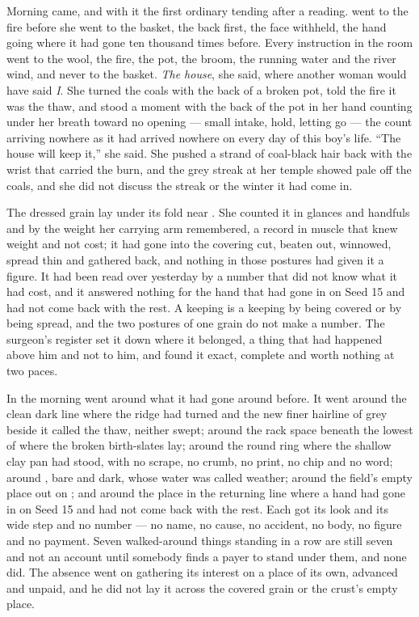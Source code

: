 Morning came, and with it the first ordinary tending after a reading.  went to the fire before she went to the basket, the back first, the face withheld, the hand going where it had gone ten thousand times before. Every instruction in the room went to the wool, the fire, the pot, the broom, the running water and the river wind, and never to the basket. \emph{The house}, she said, where another woman would have said \emph{I}. She turned the coals with the back of a broken pot, told the fire it was the thaw, and stood a moment with the back of the pot in her hand counting under her breath toward no opening --- small intake, hold, letting go --- the count arriving nowhere as it had arrived nowhere on every day of this boy's life. “The house will keep it,” she said. She pushed a strand of coal-black hair back with the wrist that carried the burn, and the grey streak at her temple showed pale off the coals, and she did not discuss the streak or the winter it had come in.

The dressed grain lay under its fold near . She counted it in glances and handfuls and by the weight her carrying arm remembered, a record in muscle that knew weight and not cost; it had gone into the covering cut, beaten out, winnowed, spread thin and gathered back, and nothing in those postures had given it a figure. It had been read over yesterday by a number that did not know what it had cost, and it answered nothing for the hand that had gone in on Seed 15 and had not come back with the rest. A keeping is a keeping by being covered or by being spread, and the two postures of one grain do not make a number. The surgeon's register set it down where it belonged, a thing that had happened above him and not to him, and found it exact, complete and worth nothing at two paces.

In  the morning went around what it had gone around before. It went around the clean dark line where the ridge had turned and the new finer hairline of grey beside it called the thaw, neither swept; around the rack space beneath the lowest of  where the broken birth-slates lay; around the round ring where the shallow clay pan had stood, with no scrape, no crumb, no print, no chip and no word; around , bare and dark, whose water was called weather; around the field's empty place out on ; and around the place in the returning line where a hand had gone in on Seed 15 and had not come back with the rest. Each got its look and its wide step and no number --- no name, no cause, no accident, no body, no figure and no payment. Seven walked-around things standing in a row are still seven and not an account until somebody finds a payer to stand under them, and none did. The absence went on gathering its interest on a place of its own, advanced and unpaid, and he did not lay it across the covered grain or the crust's empty place.


